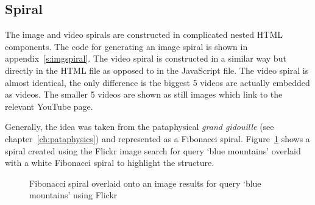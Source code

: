 \subsection{Spiral}
\label{s:spiral}

The image and video spirals are constructed in complicated nested \ac{HTML} components. The code for generating an image spiral is shown in appendix~\ref{s:imgspiral}. The video spiral is constructed in a similar way but directly in the \ac{HTML} file as opposed to in the JavaScript file. The video spiral is almost identical, the only difference is the biggest 5 videos are actually embedded as videos. The smaller 5 videos are shown as still images which link to the relevant YouTube page.

Generally, the idea was taken from the pataphysical \emph{grand gidouille} (see chap\-ter~\ref{ch:pataphysics}) and represented as a Fibonacci spiral. Figure~\ref{img:fibspiral} shows a spiral created using the Flickr image search for query `blue mountains' overlaid with a white Fibonacci spiral to highlight the structure.

\begin{figure}[!htbp] %
  \centering
  \caption[Fibonacci image spiral]{Fibonacci spiral overlaid onto an image results for query `blue mountains' using Flickr}
  \label{img:fibspiral}
\end{figure}


